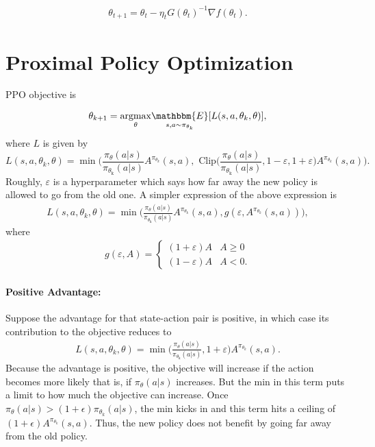 \begin{align*}
	\theta_{t+1} = \theta_t - \eta_t G(\theta_t)^{-1}\nabla f(\theta_t).
\end{align*}


\section{Proximal Policy Optimization}

PPO objective is 

$$ \theta_{k+1} = \underset{\theta}{\operatorname{argmax}} \underset{s,a\sim \pi_{\theta_k}}{\mathbbm{E}} [L(s, a, \theta_k, \theta)],$$
where $L$ is given by
$$L(s, a, \theta_k, \theta) = \min \Bigg(\frac{\pi_{\theta}\left(a | s\right)}{\pi_{\theta_{\text {k}}}\left(a | s\right)} A^{\pi_{\theta_k}}(s,a), \textrm{ Clip}\Bigg(\frac{\pi_{\theta}\left(a | s\right)}{\pi_{\theta_{\text {k}}}\left(a | s\right)}, 1-\varepsilon, 1+\varepsilon\Bigg) A^{\pi_{\theta_k}}(s,a)\Bigg).$$
Roughly, $\varepsilon$ is a hyperparameter which says how far away the new policy is allowed to go from the old one. A simpler expression of the above expression is
\begin{align}
	L(s, a, \theta_k, \theta) = \min \Bigg(\frac{\pi_{\theta}\left(a | s\right)}{\pi_{\theta_{\text {k}}}\left(a | s\right)} A^{\pi_{\theta_k}}(s,a), g(\varepsilon, A^{\pi_{\theta_k}}(s,a)) \Bigg),
	\label{eq:ppo_objective}
\end{align}
where 
\begin{align}
	g(\varepsilon,A) = 
	\begin{cases}
		(1+\varepsilon)A & A\geq 0\\
		(1-\varepsilon)A & A< 0.
	\end{cases}
	\label{eq:ppo_clip}
\end{align}

\paragraph{Positive Advantage:} Suppose the advantage for that state-action pair is positive, in which case its contribution to the objective reduces to
\begin{align}
	L(s, a, \theta_k, \theta) = \min \Bigg(\frac{\pi_{\theta}\left(a | s\right)}{\pi_{\theta_{\text {k}}}\left(a | s\right)}, 1+\varepsilon \Bigg) A^{\pi_{\theta_k}}(s,a).
	\label{eq:ppo_positive}
\end{align}
Because the advantage is positive, the objective will increase if the action becomes more likely that is, if $\pi_{\theta}(a|s)$ increases. But the min in this term puts a limit to how much the objective can increase. Once $\pi_{\theta}(a|s) > (1+\epsilon) \pi_{\theta_k}(a|s)$, the min kicks in and this term hits a ceiling of $(1+\epsilon) A^{\pi_{\theta_k}}(s,a)$. Thus, the new policy does not benefit by going far away from the old policy.

